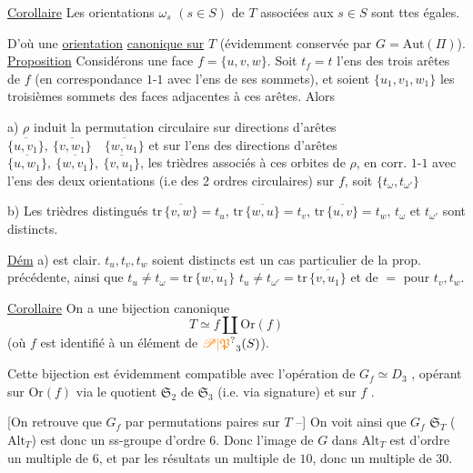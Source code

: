 \uline{Corollaire} Les orientations $\omega_s$ $(s\in S)$ de $T$ associées aux $s\in S$ sont ttes égales.

D'où une \uline{orientation} \uline{canonique sur} $T$ (évidemment conservée par $G=\mathrm{Aut}(\Pi)$).
\uline{Proposition} Considérons une face $f=\{u,v,w\}$.  Soit $t_f=t$ l'ens des trois arêtes de $f$ (en correspondance $1$-$1$ avec l'ens de ses sommets), et soient $\{u_1,v_1,w_1\}$ les troisièmes sommets des  faces  adjacentes à ces arêtes. Alors

a)  $\rho$ induit la permutation circulaire  sur   directions d'arêtes $\overline{\{u,v_1\}},\ \overline{\{v,w_1\}}\quad\overline{\{w,u_1\}}$ et sur l'ens des directions d'arêtes $\overline{\{u,w_1\}},\ \overline{\{w,v_1\}},\ \overline{\{v,u_1\}}$,
  les trièdres  associés à ces orbites de $\rho$, en corr. $1$-$1$ avec l'ens  des deux orientations (i.e des 2 ordres circulaires) sur $f$, soit $\{t_\omega,t_{\omega'}\}$

b) Les trièdres distingués $\mathrm{tr}\,\overline{\{v,w\}}=t_u$, $\mathrm{tr}\,\overline{\{w,u\}}=t_v$, $\mathrm{tr}\,\overline{\{u,v\}}=t_w$, $t_\omega$ et $t_{\omega'}$ sont distincts.

\uline{Dém} a) est clair.  $t_u,t_v,t_w$ soient distincts est un cas particulier de la prop. précédente, ainsi que $t_u\ne t_\omega=\mathrm{tr}\,\overline{\{w,u_1\}}$ $t_u\ne t_{\omega'}=\mathrm{tr}\,\overline{\{v,u_1\}}$ et de $=$ pour $t_v,t_w$.

\uline{Corollaire} On a une bijection canonique
\[
T\simeq f\amalg\mathrm{Or}(f)
\]
(où $f$ est identifié à un élément de $\unsure{\mathscr P|\mathfrak P}_3(S)$).

Cette bijection est évidemment compatible avec l'opération de $G_f\simeq D_3$ , opérant sur  $\mathrm{Or}(f)$ via le quotient $\mathfrak S_2$ de $\mathfrak S_3$ (i.e. via signature) et sur $f$ .

 [On retrouve que $G_f$   par permutations paires sur $T$ --] On voit ainsi que  $G_f$   $\mathfrak S_T$ ( $\mathrm{Alt}_T$) est donc un ss-groupe d'ordre $6$. Donc l'image de $G$ dans $\mathrm{Alt}_T$ est d'ordre un multiple de $6$, et par les résultats  un multiple de $10$, donc un multiple de $30$.

